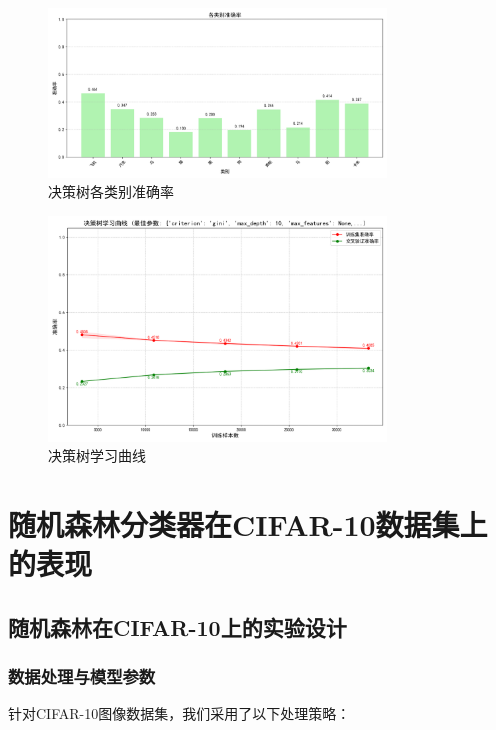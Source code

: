 \documentclass[UTF8]{report}
\theoremstyle{MyLineTheoremStyle} %
\theoremstyle{MyBlockTheoremStyle} %
\theoremstyle{MySubsubsectionStyle} %
\begin{document}
\begin{figure}[H]
    \centering
    \includegraphics[width=0.8\textwidth]{dt_acc.png}
    \caption{决策树各类别准确率}
    \label{fig:dt_class_accuracy}
\end{figure}

\begin{figure}[H]
    \centering
    \includegraphics[width=0.8\textwidth]{dt-lc2.png}
    \caption{决策树学习曲线}
    \label{fig:dt_learning_curve}
\end{figure}





\section{随机森林分类器在CIFAR-10数据集上的表现}

\subsection{随机森林在CIFAR-10上的实验设计}

\subsubsection{数据处理与模型参数}
针对CIFAR-10图像数据集，我们采用了以下处理策略：
\end{document}
